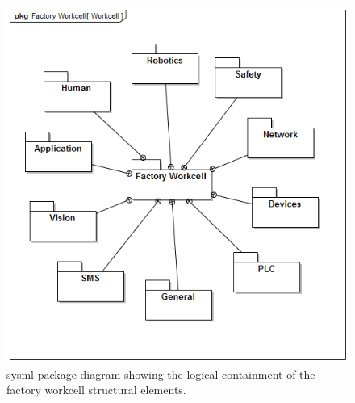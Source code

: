 \begin{figure}[t]
	\begin{center}
		\includegraphics[width=0.95\columnwidth]{./chapter-sysml/diagrams/pkg__Factory_Workcell__Workcell}%
		\caption{\Gls{sysml} package diagram showing the logical containment of the factory workcell structural elements.}%
		\label{sysml:fig:pdd-workcell}
	\end{center}
\end{figure}

